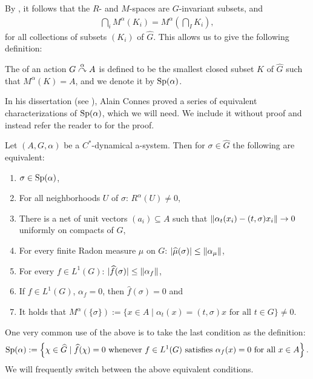 By \cite[Theorem 8.1.4]{pedersenalgauto}, it follows that the $R$- and $M$-spaces are $G$-invariant subsets, and
\begin{align*}
	\bigcap_i M^\alpha(K_i) = M^\alpha(\bigcap_I K_i),
\end{align*}
for all collections of subsets $(K_i)$ of $\hat G$. This allows us to give the following definition:
\begin{definition}
	The  of an action $G \stackrel{\alpha}{\curvearrowright} A$ is defined to be the smallest closed subset $K$ of $\hat G$ such that $M^\alpha(K) = A$, and we denote it by $\mathrm{Sp}(\alpha)$.
\end{definition}
In his dissertation (see \cite{connesclassification}), Alain Connes proved a series of equivalent characterizations of $\mathrm{Sp}(\alpha)$, which we will need. We include it without proof and instead refer the reader to \cite[Proposition 8.1.9 and 8.1.8]{pedersenalgauto} for the proof.
\begin{proposition}
	Let $(A, G, \alpha)$ be a $C^*$-dynamical a-system. Then for $\sigma \in \hat G$ the following are equivalent:
	\begin{enumerate}
		\item $\sigma \in \mathrm{Sp}(\alpha)$,
		\item For all neighborhoods $U$ of $\sigma$: $R^\alpha(U) \neq 0$,
		\item There is a net of unit vectors $(a_i) \subseteq A$ such that $\left\lVert\alpha_t(x_i) - (t,\sigma)x_i\right\rVert \to 0$ uniformly on compacts of $G$,
		\item For every finite Radon measure $\mu$ on $G$: $|\widehat{\mu}(\sigma)| \leq \left\lVert \alpha_\mu\right\rVert$,
		\item For every $f \in L^1(G)$: $|\widehat{f} (\sigma)| \leq \left\lVert \alpha_f\right\rVert$,
		\item If $f \in L^1(G)$, $\alpha_f=0$, then $\hat f(\sigma)=0$ and
		\item It holds that $M^{\alpha}(\{\sigma\}) := \{x \in A \mid  \alpha_t(x) = (t,\sigma)x \text{ for all } t \in G\} \neq 0$.
	\end{enumerate}
\end{proposition}
One very common use of the above is to take the last condition as the definition:
\begin{align*}
		\mathrm{Sp}(\alpha) := \left\{ \chi \in \widehat{G} \mid \widehat{f}(\chi) = 0 \text{ whenever } f \in L^1(G) \text{ satisfies } \alpha_f(x) = 0 \text{ for all } x \in A  \right\}.
	\end{align*}
We will frequently switch between the above equivalent conditions.

